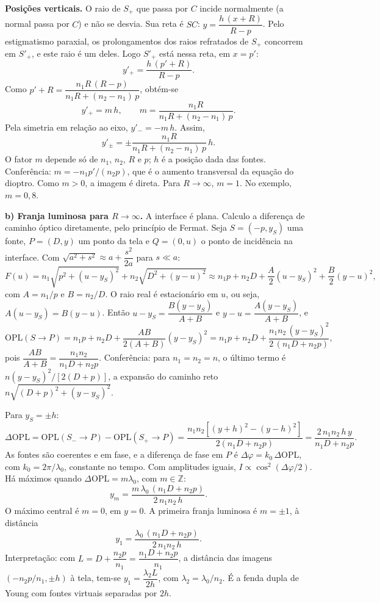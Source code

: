 \documentclass{article}%
\begin{document}
\textbf{Posições verticais.} O raio de $S_+$ que passa por $C$ incide normalmente (a normal passa por $C$) e não se desvia. Sua reta é $SC$: $y=\dfrac{h\,(x+R)}{R-p}$. Pelo estigmatismo paraxial, os prolongamentos dos raios refratados de $S_+$ concorrem em $S'_+$, e este raio é um deles. Logo $S'_+$ está nessa reta, em $x=p'$:
\[
y'_+=\frac{h\,(p'+R)}{R-p}.
\]
Como $p'+R=\dfrac{n_1R\,(R-p)}{n_1R+(n_2-n_1)\,p}$, obtém-se
\[
y'_+=m\,h,\qquad m=\frac{n_1R}{n_1R+(n_2-n_1)\,p}.
\]
Pela simetria em relação ao eixo, $y'_-=-m\,h$. Assim,
\[
y'_\pm=\pm\frac{n_1R}{n_1R+(n_2-n_1)\,p}\,h.
\]
O fator $m$ depende só de $n_1$, $n_2$, $R$ e $p$; $h$ é a posição dada das fontes. Conferência: $m=-n_1p'/(n_2p)$, que é o aumento transversal da equação do dioptro. Como $m>0$, a imagem é direta. Para $R\to\infty$, $m=1$. No exemplo, $m=0{,}8$.

\textbf{b) Franja luminosa para $R\to\infty$.} A interface é plana. Calculo a diferença de caminho óptico diretamente, pelo princípio de Fermat. Seja $S=(-p,y_S)$ uma fonte, $P=(D,y)$ um ponto da tela e $Q=(0,u)$ o ponto de incidência na interface. Com $\sqrt{a^2+s^2}\approx a+\dfrac{s^2}{2a}$ para $s\ll a$:
\[
F(u)=n_1\sqrt{p^2+(u-y_S)^2}+n_2\sqrt{D^2+(y-u)^2}\approx n_1p+n_2D+\frac{A}{2}(u-y_S)^2+\frac{B}{2}(y-u)^2,
\]
com $A=n_1/p$ e $B=n_2/D$. O raio real é estacionário em $u$, ou seja, $A(u-y_S)=B(y-u)$. Então $u-y_S=\dfrac{B(y-y_S)}{A+B}$ e $y-u=\dfrac{A(y-y_S)}{A+B}$, e
\[
\mathrm{OPL}(S\to P)=n_1p+n_2D+\frac{AB}{2(A+B)}(y-y_S)^2=n_1p+n_2D+\frac{n_1n_2\,(y-y_S)^2}{2\,(n_1D+n_2p)},
\]
pois $\dfrac{AB}{A+B}=\dfrac{n_1n_2}{n_1D+n_2p}$. Conferência: para $n_1=n_2=n$, o último termo é $n(y-y_S)^2/[2(D+p)]$, a expansão do caminho reto $n\sqrt{(D+p)^2+(y-y_S)^2}$.

Para $y_S=\pm h$:
\[
\Delta\mathrm{OPL}=\mathrm{OPL}(S_-\to P)-\mathrm{OPL}(S_+\to P)=\frac{n_1n_2\left[(y+h)^2-(y-h)^2\right]}{2(n_1D+n_2p)}=\frac{2\,n_1n_2\,h\,y}{n_1D+n_2p}.
\]
As fontes são coerentes e em fase, e a diferença de fase em $P$ é $\Delta\varphi=k_0\,\Delta\mathrm{OPL}$, com $k_0=2\pi/\lambda_0$, constante no tempo. Com amplitudes iguais, $I\propto\cos^2(\Delta\varphi/2)$. Há máximos quando $\Delta\mathrm{OPL}=m\lambda_0$, com $m\in\mathbb{Z}$:
\[
y_m=\frac{m\,\lambda_0\,(n_1D+n_2p)}{2\,n_1n_2\,h}.
\]
O máximo central é $m=0$, em $y=0$. A primeira franja luminosa é $m=\pm1$, à distância
\[
y_1=\frac{\lambda_0\,(n_1D+n_2p)}{2\,n_1n_2\,h}.
\]
Interpretação: com $L=D+\dfrac{n_2p}{n_1}=\dfrac{n_1D+n_2p}{n_1}$, a distância das imagens $(-n_2p/n_1,\pm h)$ à tela, tem-se $y_1=\dfrac{\lambda_2L}{2h}$, com $\lambda_2=\lambda_0/n_2$. É a fenda dupla de Young com fontes virtuais separadas por $2h$.
\end{document}
